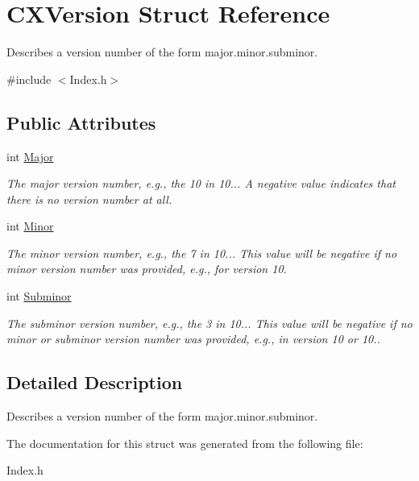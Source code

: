 \hypertarget{structCXVersion}{}\section{C\+X\+Version Struct Reference}
\label{structCXVersion}


Describes a version number of the form major.\+minor.\+subminor.  




{\ttfamily \#include $<$Index.\+h$>$}

\subsection*{Public Attributes}
\begin{DoxyCompactItemize}
\item 
\mbox{\label{structCXVersion_a04650af435ba5d89c7b2254b3b21eaeb}} 
int \hyperlink{structCXVersion_a04650af435ba5d89c7b2254b3b21eaeb}{Major}
\begin{DoxyCompactList}\small\item\em The major version number, e.\+g., the \textquotesingle{}10\textquotesingle{} in \textquotesingle{}10..\textquotesingle{}. A negative value indicates that there is no version number at all. \end{DoxyCompactList}\item 
\mbox{\label{structCXVersion_aff74ef39e4cbd8ec7b98452f3a044335}} 
int \hyperlink{structCXVersion_aff74ef39e4cbd8ec7b98452f3a044335}{Minor}
\begin{DoxyCompactList}\small\item\em The minor version number, e.\+g., the \textquotesingle{}7\textquotesingle{} in \textquotesingle{}10..\textquotesingle{}. This value will be negative if no minor version number was provided, e.\+g., for version \textquotesingle{}10\textquotesingle{}. \end{DoxyCompactList}\item 
\mbox{\label{structCXVersion_a1c6a879a09c67286c0730c926ae58ad9}} 
int \hyperlink{structCXVersion_a1c6a879a09c67286c0730c926ae58ad9}{Subminor}
\begin{DoxyCompactList}\small\item\em The subminor version number, e.\+g., the \textquotesingle{}3\textquotesingle{} in \textquotesingle{}10..\textquotesingle{}. This value will be negative if no minor or subminor version number was provided, e.\+g., in version \textquotesingle{}10\textquotesingle{} or \textquotesingle{}10.\textquotesingle{}. \end{DoxyCompactList}\end{DoxyCompactItemize}


\subsection{Detailed Description}
Describes a version number of the form major.\+minor.\+subminor. 

The documentation for this struct was generated from the following file\+:\begin{DoxyCompactItemize}
\item 
Index.\+h\end{DoxyCompactItemize}
